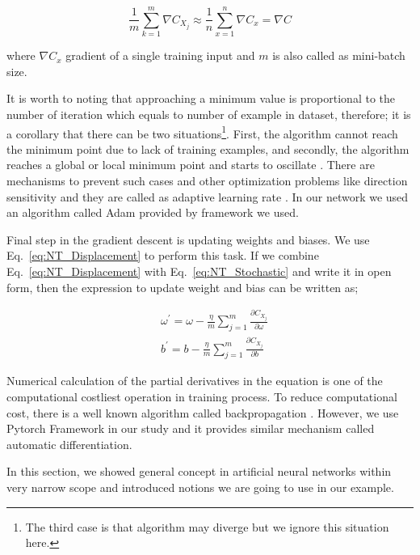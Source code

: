 \documentclass[a4paper,times,12pt]{article}
\begin{document}
\begin{equation}
\label{eq:NT_Stochastic}
\frac{1}{m} \sum\limits_{k = 1}^{m} \nabla{C_{X_j}} \approx \frac{1}{n}\sum\limits_{x = 1}^{n} \nabla{C_{x}} = \nabla{C}
\end{equation}

\noindent where $\nabla{C_x}$ gradient of a single training input and $m$ is also called as mini-batch size.

It is worth to noting that approaching a minimum value is proportional to the number of iteration which equals to number of example in dataset, therefore; it is a corollary that there can be two situations\footnote{The third case is that algorithm may diverge but we ignore this situation here.}. First, the algorithm cannot reach the minimum point due to lack of training examples, and secondly, the algorithm reaches a global or local minimum point and starts to oscillate \cite{zeiler2012adadelta}. There are mechanisms to prevent such cases and other optimization problems like direction sensitivity and they are called as adaptive learning rate \cite{mills2017deep}. In our network we used an algorithm called Adam \cite{kingma2014adam} provided by framework we used.  

Final step in the gradient descent is updating weights and biases. We use Eq.~\ref{eq:NT_Displacement} to perform this task. If we combine Eq.~\ref{eq:NT_Displacement} with Eq.~\ref{eq:NT_Stochastic} and write it in open form, then the expression to update weight and bias can be written as;

\begin{equation}
\label{eq:NT_weight_bias_update}
\begin{split}
& \omega^{\prime} = \omega - \frac{\eta}{m} \sum\limits_{j = 1}^{m} \frac{\partial{C_{X_j}}}{\partial{\omega}} \\
& b^{\prime} = b- \frac{\eta}{m} \sum\limits_{j = 1}^{m} \frac{\partial{C_{X_j}}}{\partial{b}}
\end{split}
\end{equation}

\noindent Numerical calculation of the partial derivatives in the equation is one of the computational costliest operation in training process. To reduce computational cost, there is a well known algorithm called backpropagation \cite{goodfellow2016deep}. However, we use Pytorch Framework in our study and it provides similar mechanism called automatic differentiation. 

In this section, we showed general concept in artificial neural networks within very narrow scope and introduced notions we are going to use in our example. 
\end{document}
